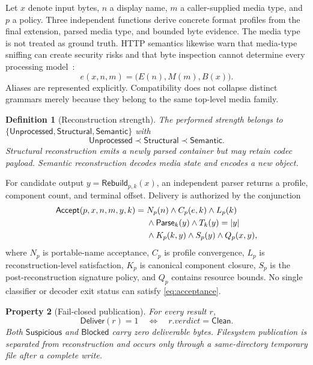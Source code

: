\documentclass[preprint,12pt]{elsarticle}
\newtheorem{definition}{Definition}[section]
\newtheorem{property}[definition]{Property}
\newcommand{\Clean}{\mathsf{Clean}}
\newcommand{\Suspicious}{\mathsf{Suspicious}}
\newcommand{\Blocked}{\mathsf{Blocked}}
\newcommand{\Unprocessed}{\mathsf{Unprocessed}}
\newcommand{\Structural}{\mathsf{Structural}}
\newcommand{\Semantic}{\mathsf{Semantic}}
\newcommand{\Accept}{\mathsf{Accept}}
\newcommand{\Parse}{\mathsf{Parse}}
\newcommand{\Rebuild}{\mathsf{Rebuild}}
\newcommand{\Deliver}{\mathsf{Deliver}}
\begin{document}
Let $x$ denote input bytes, $n$ a display name, $m$ a caller-supplied media
type, and $p$ a policy. Three independent functions derive concrete format
profiles from the final extension, parsed media type, and bounded byte evidence.
The media type is not treated as ground truth. HTTP semantics likewise warn
that media-type sniffing can create security risks and that byte inspection
cannot determine every processing model~\cite{rfc9110}:
\begin{equation}
  e(x,n,m)=\bigl(E(n),M(m),B(x)\bigr).
  \label{eq:evidence}
\end{equation}
Aliases are represented explicitly. Compatibility does not collapse distinct
grammars merely because they belong to the same top-level media family.

\begin{definition}[Reconstruction strength]
The performed strength belongs to
$\{\Unprocessed,\Structural,\Semantic\}$ with
\begin{equation}
  \Unprocessed \prec \Structural \prec \Semantic.
  \label{eq:strength}
\end{equation}
Structural reconstruction emits a newly parsed container but may retain codec
payload. Semantic reconstruction decodes media state and encodes a new object.
\end{definition}

For candidate output $y=\Rebuild_{p,k}(x)$, an independent parser returns a
profile, component count, and terminal offset. Delivery is authorized by the
conjunction
\begin{align}
\Accept(p,x,n,m,y,k)={}&N_p(n) \land C_p(e,k) \land L_p(k) \notag\\
 &\land \Parse_k(y) \land T_k(y)=|y| \notag\\
 &\land K_p(k,y) \land S_p(y) \land Q_p(x,y),
\label{eq:acceptance}
\end{align}
where $N_p$ is portable-name acceptance, $C_p$ is profile convergence, $L_p$
is reconstruction-level satisfaction, $K_p$ is canonical component closure,
$S_p$ is the post-reconstruction signature policy, and $Q_p$ contains resource
bounds. No single classifier or decoder exit status can satisfy
\cref{eq:acceptance}.

\begin{property}[Fail-closed publication]
For every result $r$,
\begin{equation}
  \Deliver(r)=1 \quad\Longleftrightarrow\quad r.\mathit{verdict}=\Clean.
  \label{eq:delivery}
\end{equation}
Both $\Suspicious$ and $\Blocked$ carry zero deliverable bytes. Filesystem
publication is separated from reconstruction and occurs only through a
same-directory temporary file after a complete write.
\end{property}
\end{document}
